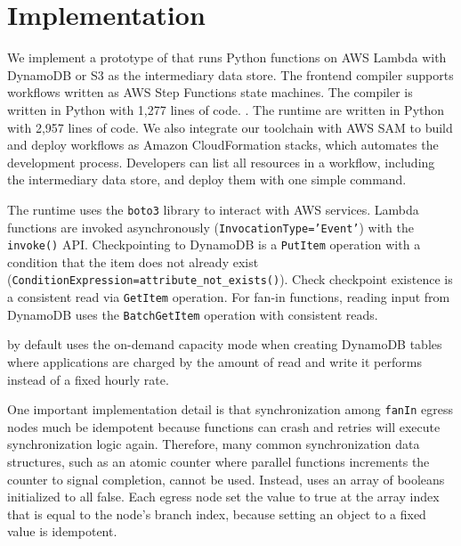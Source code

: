 \section{Implementation}\label{sec:impl}

We implement a prototype of \name{} that runs Python functions on AWS Lambda
with DynamoDB or S3 as the intermediary data store. The frontend compiler
supports workflows written as AWS Step Functions state machines. The compiler
is written in Python with 1,277 lines of code. . The
runtime are written in Python with 2,957 lines of code. We also integrate our
toolchain with AWS SAM to build and deploy \name{} workflows as Amazon
CloudFormation stacks, which automates the development process. Developers can
list all resources in a workflow, including the intermediary data store, and
deploy them with one simple command.

The runtime uses the \texttt{boto3} library to interact with AWS services.
Lambda functions are invoked asynchronously (\texttt{InvocationType='Event'})
with the \texttt{invoke()} API. Checkpointing to DynamoDB is a
\texttt{PutItem} operation with a condition that the item does not already
exist (\texttt{ConditionExpression=attribute\_not\_exists()}). Check
checkpoint existence is a consistent read via \texttt{GetItem} operation. For
fan-in functions, reading input from DynamoDB uses the \texttt{BatchGetItem}
operation with consistent reads.

\name{} by default uses the on-demand capacity mode when creating DynamoDB
tables where applications are charged by the amount of read and write it
performs instead of a fixed hourly rate.

One important implementation detail is that synchronization among
\texttt{fanIn} egress nodes much be idempotent because functions can crash and
retries will execute synchronization logic again. Therefore, many common
synchronization data structures, such as an atomic counter where parallel
functions increments the counter to signal completion, cannot be used.
Instead, \name{} uses an array of booleans initialized to all false. Each
egress node set the value to true at the array index that is equal to the
node's branch index, because setting an object to a fixed value is idempotent.
